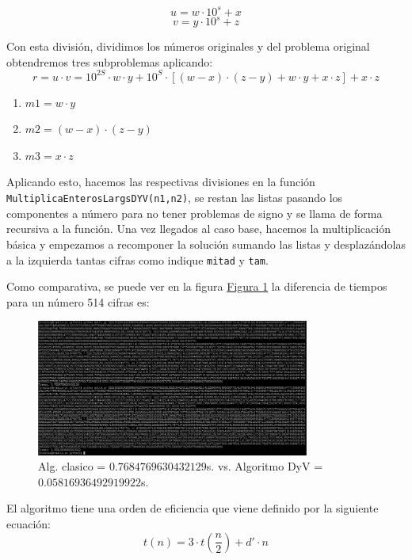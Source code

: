 \documentclass[10pt,a4paper,spanish]{report}
\begin{document}
\begin{center}
  
  $$u = w \cdot 10^s + x$$
  $$v = y \cdot 10^s + z$$
\end{center}

Con esta división, dividimos los números originales y del problema original obtendremos tres subproblemas aplicando:
\begin{displaymath}
  r = u \cdot v = 10^{2S}\cdot w \cdot y + 10^S \cdot \left[(w - x) \cdot (z-y) + w\cdot y + x\cdot z\right] + x\cdot z
\end{displaymath}


\begin{enumerate}[---]
  \item $m1=w\cdot y$
  \item $m2=(w-x) \cdot (z-y)$
  \item $m3=x\cdot z$
\end{enumerate}

Aplicando esto, hacemos las respectivas divisiones en la función \verb*|MultiplicaEnterosLargsDYV(n1,n2)|, se restan las listas pasando los componentes a número para no tener problemas de signo y se llama de forma recursiva a la función. Una vez llegados al caso base, hacemos la multiplicación básica y empezamos a recomponer la solución sumando las listas y desplazándolas a la izquierda tantas cifras como indique \verb|mitad| y \verb|tam|.

Como comparativa, se puede ver en la figura \hyperref[comparativa]{Figura \ref*{comparativa}} la diferencia de tiempos para un número 514 cifras es:
\begin{center}
\begin{figure}[!h]
\centering
\includegraphics[width=0.8\textwidth]{figura1}
\caption{Alg. clasico = $0.7684769630432129$s. vs. Algoritmo DyV = $0.05816936492919922$s.}
\label{comparativa}
\end{figure}
\end{center}

El algoritmo tiene una orden de eficiencia que viene definido por la siguiente ecuación:
\begin{displaymath}
  t(n) = 3 \cdot t\left(\frac{n}{2}\right)+d'\cdot n
\end{displaymath}
\end{document}
